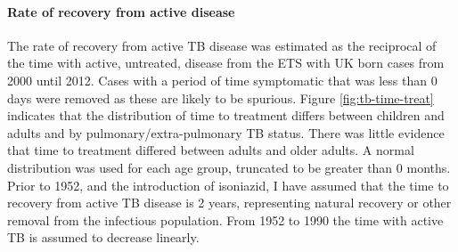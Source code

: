 \documentclass[11pt,twoside]{bristolthesis}
\begin{document}
  \hypertarget{rate-of-recovery-from-active-disease}{%
  \paragraph{Rate of recovery from active disease}\label{rate-of-recovery-from-active-disease}}
  
  The rate of recovery from active TB disease was estimated as the reciprocal of the time with active, untreated, disease from the ETS with UK born cases from 2000 until 2012. Cases with a period of time symptomatic that was less than 0 days were removed as these are likely to be spurious. Figure \ref{fig:tb-time-treat} indicates that the distribution of time to treatment differs between children and adults and by pulmonary/extra-pulmonary TB status. There was little evidence that time to treatment differed between adults and older adults. A normal distribution was used for each age group, truncated to be greater than 0 months. Prior to 1952, and the introduction of isoniazid, I have assumed that the time to recovery from active TB disease is 2 years, representing natural recovery or other removal from the infectious population. From 1952 to 1990 the time with active TB is assumed to decrease linearly.
  
\end{document}
